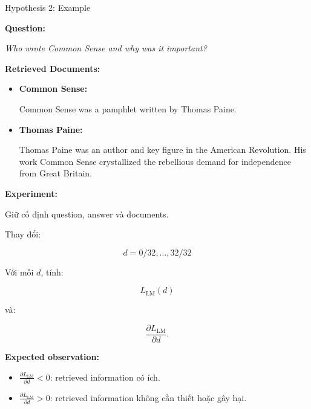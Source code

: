 \begin{frame}{Hypothesis 2: Example}

\textbf{Question:}

\textit{Who wrote Common Sense and why was it important?}

\vspace{0.2cm}

\textbf{Retrieved Documents:}

\begin{itemize}
    \item \textbf{Common Sense:}

    Common Sense was a pamphlet written by Thomas Paine.

    \item \textbf{Thomas Paine:}

    Thomas Paine was an author and key figure in the American Revolution. His work Common Sense crystallized the rebellious demand for independence from Great Britain.
\end{itemize}

\vspace{0.15cm}

\textbf{Experiment:}

Giữ cố định question, answer và documents.

\vspace{0.1cm}

Thay đổi:

\[
d=0/32,\ldots,32/32
\]

\vspace{0.1cm}

Với mỗi $d$, tính:

\[
L_{\mathrm{LM}}(d)
\]

và:

\[
\frac{\partial L_{\mathrm{LM}}}{\partial d}.
\]

\vspace{0.15cm}

\textbf{Expected observation:}

\begin{itemize}
    \item $\frac{\partial L_{\mathrm{LM}}}{\partial d}<0$: retrieved information có ích.
    \item $\frac{\partial L_{\mathrm{LM}}}{\partial d}>0$: retrieved information không cần thiết hoặc gây hại.
\end{itemize}

\end{frame}